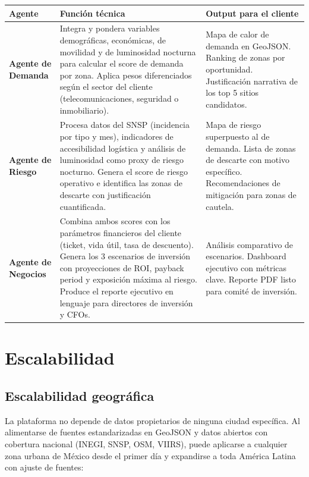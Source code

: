 \documentclass[12pt,a4paper]{article}
\begin{document}
\begin{table}[H]
\centering
\small
\renewcommand{\arraystretch}{1.3}
\begin{tabularx}{\textwidth}{>{\bfseries}l X X}
\toprule
\rowcolor{grisoscuro}
\color{white}\textbf{Agente} & \color{white}\textbf{Función técnica} & \color{white}\textbf{Output para el cliente} \\
\midrule
Agente de Demanda & Integra y pondera variables demográficas, económicas, de movilidad y de luminosidad nocturna para calcular el score de demanda por zona. Aplica pesos diferenciados según el sector del cliente (telecomunicaciones, seguridad o inmobiliario). & Mapa de calor de demanda en GeoJSON. Ranking de zonas por oportunidad. Justificación narrativa de los top 5 sitios candidatos. \\
\rowcolor{fondofila}
Agente de Riesgo & Procesa datos del SNSP (incidencia por tipo y mes), indicadores de accesibilidad logística y análisis de luminosidad como proxy de riesgo nocturno. Genera el score de riesgo operativo e identifica las zonas de descarte con justificación cuantificada. & Mapa de riesgo superpuesto al de demanda. Lista de zonas de descarte con motivo específico. Recomendaciones de mitigación para zonas de cautela. \\
Agente de Negocios & Combina ambos scores con los parámetros financieros del cliente (ticket, vida útil, tasa de descuento). Genera los 3 escenarios de inversión con proyecciones de ROI, payback period y exposición máxima al riesgo. Produce el reporte ejecutivo en lenguaje para directores de inversión y CFOs. & Análisis comparativo de escenarios. Dashboard ejecutivo con métricas clave. Reporte PDF listo para comité de inversión. \\
\bottomrule
\end{tabularx}
\end{table}


\newpage
\section{Escalabilidad}

\subsection{Escalabilidad geográfica}

La plataforma no depende de datos propietarios de ninguna ciudad específica. Al alimentarse de fuentes estandarizadas en GeoJSON y datos abiertos con cobertura nacional (INEGI, SNSP, OSM, VIIRS), puede aplicarse a cualquier zona urbana de México desde el primer día y expandirse a toda América Latina con ajuste de fuentes:
\end{document}
